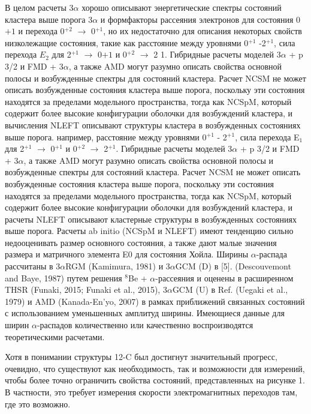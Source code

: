 \documentclass[fontsize=14pt]{scrarticle}
\begin{document}
В целом расчеты 3$\alpha$ хорошо описывают энергетические спектры состояний кластера выше порога 3$\alpha$ и формфакторы рассеяния электронов для состояния 0${+1}$ и перехода 0$^{+2}$ $\rightarrow$ 0$^{+1}$, но их недостаточно для описания некоторых свойств низколежащие состояния, такие как расстояние между уровнями 0$^{+1}$ -2$^{+1}$, сила перехода $E_{2}$ для 2$^{+1}$ $\rightarrow$ 0${+1}$ и 0$^{+2}$ $\rightarrow$ 2 1. Гибридные расчеты моделей 3$\alpha$ + p 3/2 и FMD + 3$\alpha$, а также AMD могут разумно описать свойства основной полосы и возбужденные спектры для состояний кластера. Расчет NCSM не может описать возбужденные состояния кластера выше порога, поскольку эти состояния находятся за пределами модельного пространства, тогда как NCSpM, который содержит более высокие конфигурации оболочки для возбуждений кластера, и вычисления NLEFT описывают структуры кластера в возбужденных состояниях выше порога. например, расстояние между уровнями 0$^{+1}$ - 2$^{+1}$, сила перехода E$_{1}$ для 2$^{+1}$ $\rightarrow$ 0$^{+1}$ и 0$^{+2}$ $\rightarrow$ 2$^{+1}$. Гибридные расчеты моделей 3$\alpha$ + p 3/2 и FMD + 3$\alpha$, а также AMD могут разумно описать свойства основной полосы и возбужденные спектры для состояний кластера. Расчет NCSM не может описать возбужденные состояния кластера выше порога, поскольку эти состояния находятся за пределами модельного пространства, тогда как NCSpM, который содержит более высокие конфигурации оболочки для возбуждений кластера, и расчеты NLEFT описывают кластерные структуры в возбужденных состояниях выше порога. Расчеты ab initio (NCSpM и NLEFT) имеют тенденцию сильно недооценивать размер основного состояния, а также дают малые значения размера и матричного элемента E0 для состояния Хойла. Ширины $\alpha$-распада рассчитаны в 3$\alpha$RGM (Kamimura, 1981) и 3$\alpha$GCM (D) в [5]. (Descouvemont and Baye, 1987) путем решения $^{8}$Be + $\alpha$-рассеяния и оценены в расширенном THSR (Funaki, 2015; Funaki et al., 2015), 3$\alpha$GCM (U) в Ref. (Uegaki et al., 1979) и AMD (Kanada-En'yo, 2007) в рамках приближений связанных состояний с использованием уменьшенных амплитуд ширины. Имеющиеся данные для ширин $\alpha$-распадов количественно или качественно воспроизводятся теоретическими расчетами.

Хотя в понимании структуры 12-C был достигнут значительный прогресс, очевидно, что существуют как необходимость, так и возможности для измерений, чтобы более точно ограничить свойства состояний, представленных на рисунке 1. В частности, это требует измерения скорости электромагнитных переходов там, где это возможно.
\end{document}
